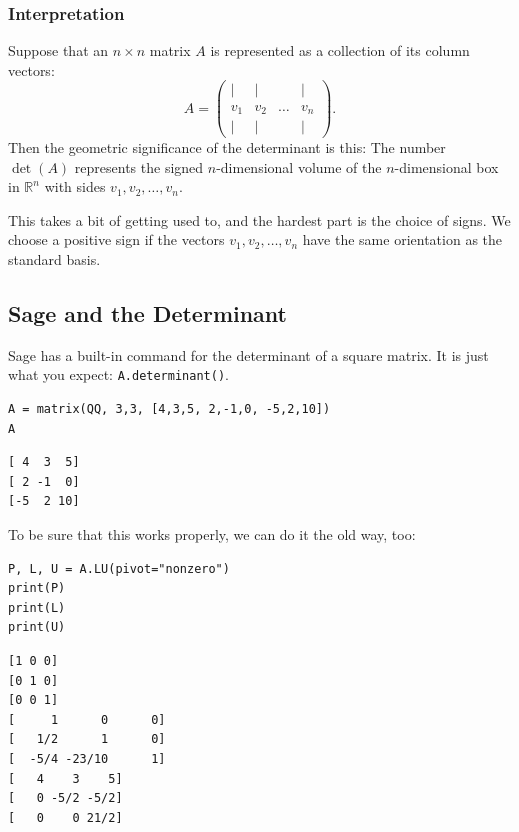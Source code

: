 \documentclass[10pt,]{book}
\theoremstyle{plain}
\theoremstyle{definition}
\numberwithin{equation}{section}
\begin{document}
\subsubsection[Interpretation]{Interpretation}\label{subsubsection-47}

        Suppose that an \(n\times n\) matrix \(A\) is represented as a
        collection of its column vectors:
        \[
        A = \begin{pmatrix}
        | & | &  & | \\
        v_1 & v_2 & \dots & v_n \\
        | & | &  & |
        \end{pmatrix} .
        \]
        Then the geometric significance of the determinant is this: The number
        \(\det(A)\) represents the signed \(n\)-dimensional
        volume of the \(n\)-dimensional box in \(\mathbb{R}^n\) with sides
        \(v_1, v_2, \ldots, v_n\).
\par

        This takes a bit of getting used to, and the hardest part is the choice
        of signs. We choose a positive sign if the vectors
        \(v_1, v_2, \ldots, v_n\) have the same orientation as the standard
        basis.
\typeout{************************************************}
\typeout{************************************************}
\subsection[Sage and the Determinant]{Sage and the Determinant}\label{subsection-118}
Sage has a built-in command for the determinant of a square matrix. It is
      just what you expect: \verb?A.determinant()?.
\begin{lstlisting}[style=sageinput]
A = matrix(QQ, 3,3, [4,3,5, 2,-1,0, -5,2,10])
A
\end{lstlisting}
\begin{lstlisting}[style=sageoutput]
[ 4  3  5]
[ 2 -1  0]
[-5  2 10]
\end{lstlisting}
\par
To be sure that this works properly, we can do it the old way, too:%
\begin{lstlisting}[style=sageinput]
P, L, U = A.LU(pivot="nonzero")
print(P)
print(L)
print(U)
\end{lstlisting}
\begin{lstlisting}[style=sageoutput]
[1 0 0]
[0 1 0]
[0 0 1]
[     1      0      0]
[   1/2      1      0]
[  -5/4 -23/10      1]
[   4    3    5]
[   0 -5/2 -5/2]
[   0    0 21/2]
\end{lstlisting}
\par
\end{document}
